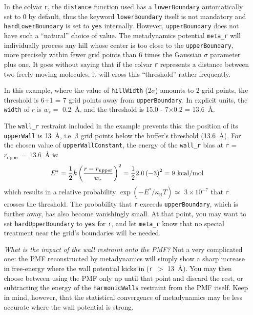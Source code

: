 In the colvar \texttt{r}, the \texttt{distance} function used has a \texttt{lowerBoundary} automatically set to 0 by default, thus the keyword \texttt{lowerBoundary} itself is not mandatory and \texttt{hardLowerBoundary} is set to \texttt{yes} internally.
However, \texttt{upperBoundary} does not have such a ``natural'' choice of value.
The metadynamics potential \texttt{meta\_r} will individually process any hill whose center is too close to the \texttt{upperBoundary}, more precisely within fewer grid points than 6 times the Gaussian $\sigma$ parameter plus one.
It goes without saying that if the colvar \texttt{r} represents a distance between two freely-moving molecules, it will cross this ``threshold'' rather frequently.

In this example, where the value of \texttt{hillWidth} ($2\sigma$) amounts to 2 grid points, the threshold is 6+1 = 7 grid points away from \texttt{upperBoundary}.
In explicit units, the \texttt{width} of $r$ is $w_r =$ 0.2~\AA, and the threshold is 15.0 - 7$\times$0.2 = 13.6~\AA.

The \texttt{wall\_r} restraint included in the example prevents this: the position of its \texttt{upperWall} is 13~\AA{}, i.e.{} 3 grid points below the buffer's threshold (13.6~\AA).
For the chosen value of \texttt{upperWallConstant}, the energy of the \texttt{wall\_r} bias at \texttt{r} = $r_{\mathrm{upper}}$ = 13.6~\AA{} is:
\begin{equation*}
  E^* = \frac{1}{2} \- k \left(\frac{r - r_{\mathrm{upper}}}{w_r}\right)^2 = \frac{1}{2} \- 2.0 \left(-3\right)^2 = 9~\mathrm{kcal/mol}
\end{equation*}
which results in a relative probability $\exp(-E^*/\kappa_{\mathrm{B}}T) \simeq$ $3\times{}10^{-7}$ that \texttt{r} crosses the threshold.
The probability that \texttt{r} exceeds \texttt{upperBoundary}, which is further away, has also become vanishingly small.
At that point, you may want to set \texttt{hardUpperBoundary} to \texttt{yes} for \texttt{r}, and let \texttt{meta\_r} know that no special treatment near the grid's boundaries will be needed.

\emph{What is the impact of the wall restraint onto the PMF?} Not a very complicated one: the PMF reconstructed by metadynamics will simply show a sharp increase in free-energy where the wall potential kicks in (\texttt{r}~$>$ 13~\AA{}).
You may then choose between using the PMF only up until that point and discard the rest, or subtracting the energy of the \texttt{harmonicWalls} restraint from the PMF itself.
Keep in mind, however, that the statistical convergence of metadynamics may be less accurate where the wall potential is strong.

